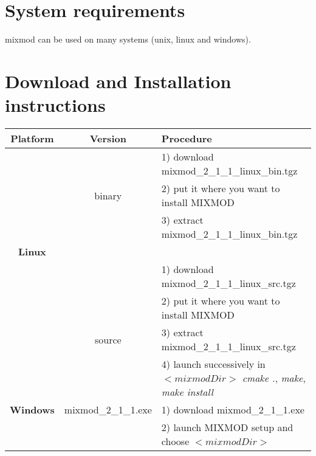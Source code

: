 \section{System requirements}
{\sc mixmod} can be used on many systems (unix, linux and windows).\\


\section{Download and Installation instructions}
\hspace{-1cm}
\begin{tabular}{|c|c|l|}

 \hline
Platform & Version & Procedure \\

\hline



 & & 1) download mixmod\_2\_1\_1\_linux\_bin.tgz \\
 & binary& 2) put it where you want to install MIXMOD  \\
 & & 3) extract  mixmod\_2\_1\_1\_linux\_bin.tgz \\




{\bf Linux} & & \\
\cline{2-3}
&  &  1) download mixmod\_2\_1\_1\_linux\_src.tgz \\
 & & 2) put it where you want to install MIXMOD  \\
 &source & 3) extract  mixmod\_2\_1\_1\_linux\_src.tgz \\
& & 4) launch successively in {\em $<mixmodDir>$} {\em cmake .}, {\em make}, {\em make install}\\
\hline

{\bf Windows} & mixmod\_2\_1\_1.exe & 1) download mixmod\_2\_1\_1.exe\\
& & 2) launch MIXMOD setup and choose {\em $<mixmodDir>$}\\
\hline
\end{tabular}


